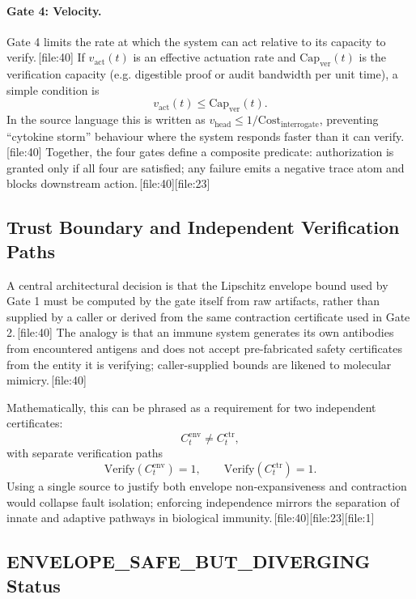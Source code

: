 \documentclass[11pt]{article}
\begin{document}
\paragraph{Gate 4: Velocity.}

Gate 4 limits the rate at which the system can act relative to its capacity to verify.\,[file:40]
If \(v_{\mathrm{act}}(t)\) is an effective actuation rate and \(\mathrm{Cap}_{\mathrm{ver}}(t)\) is the verification capacity (e.g. digestible proof or audit bandwidth per unit time), a simple condition is
\[
v_{\mathrm{act}}(t) \le \mathrm{Cap}_{\mathrm{ver}}(t).
\]
In the source language this is written as \(v_{\mathrm{head}}\le 1/\mathrm{Cost}_{\mathrm{interrogate}}\), preventing “cytokine storm” behaviour where the system responds faster than it can verify.\,[file:40]
Together, the four gates define a composite predicate: authorization is granted only if all four are satisfied; any failure emits a negative trace atom and blocks downstream action.\,[file:40][file:23]

\subsection*{Trust Boundary and Independent Verification Paths}

A central architectural decision is that the Lipschitz envelope bound used by Gate 1 must be computed by the gate itself from raw artifacts, rather than supplied by a caller or derived from the same contraction certificate used in Gate 2.\,[file:40]
The analogy is that an immune system generates its own antibodies from encountered antigens and does not accept pre-fabricated safety certificates from the entity it is verifying; caller-supplied bounds are likened to molecular mimicry.\,[file:40]

Mathematically, this can be phrased as a requirement for two independent certificates:
\[
C_t^{\mathrm{env}} \neq C_t^{\mathrm{ctr}},
\]
with separate verification paths
\[
\mathrm{Verify}(C_t^{\mathrm{env}}) = 1,\qquad
\mathrm{Verify}(C_t^{\mathrm{ctr}}) = 1.
\]
Using a single source to justify both envelope non-expansiveness and contraction would collapse fault isolation; enforcing independence mirrors the separation of innate and adaptive pathways in biological immunity.\,[file:40][file:23][file:1]

\subsection*{ENVELOPE\_SAFE\_BUT\_DIVERGING Status}
\end{document}
